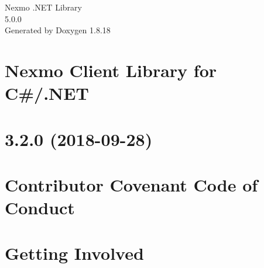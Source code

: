 \let\mypdfximage\pdfximage\def\pdfximage{\immediate\mypdfximage}\documentclass[twoside]{book}
\newcommand{\+}{\discretionary{\mbox{\scriptsize$\hookleftarrow$}}{}{}}
\newcommand{\clearemptydoublepage}{%
  \newpage{\pagestyle{empty}\cleardoublepage}%
}
\begin{document}
\hypersetup{pageanchor=false,
             bookmarksnumbered=true,
             pdfencoding=unicode
            }
\begin{titlepage}
\vspace*{7cm}
\begin{center}%
{\Large Nexmo .N\+ET Library \\[1ex]\large 5.\+0.\+0 }\\
\vspace*{1cm}
{\large Generated by Doxygen 1.8.18}\\
\end{center}
\end{titlepage}
\clearemptydoublepage
{}
\tableofcontents
\clearemptydoublepage
{}
\hypersetup{pageanchor=true}

\chapter{Nexmo Client Library for C\#/.N\+ET}
\label{index}\hypertarget{index}{}
\chapter{3.2.0 (2018-\/09-\/28)}
\label{md__c_1__users_slore__documents_projects_slorello89_nexmo-dotnet__c_h_a_n_g_e_l_o_g}

\chapter{Contributor Covenant Code of Conduct}
\label{md__c_1__users_slore__documents_projects_slorello89_nexmo-dotnet__c_o_d_e__o_f__c_o_n_d_u_c_t}

\chapter{Getting Involved}
\label{md__c_1__users_slore__documents_projects_slorello89_nexmo-dotnet__c_o_n_t_r_i_b_u_t_i_n_g}

\end{document}

